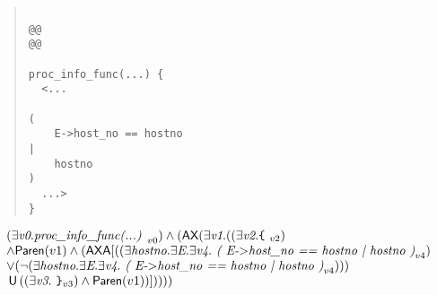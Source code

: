 \documentclass{article}
\newcommand{\U}{\,\mbox{\sf{U}}\,}
\newcommand{\A}{\mbox{\sf{A}}}
\newcommand{\AX}{\mbox{\sf{AX}}}
\newcommand{\mita}[1]{\mbox{\it{{#1}}}}
\newcommand{\msf}[1]{\mbox{\sf{{#1}}}}
\newcommand{\mth}[1]{\({#1}\)}
\newcommand{\ttlb}{\mbox{\tt \char'173}}
\newcommand{\ttrb}{\mbox{\tt \char'175}}
\begin{document}
\begin{quote}\begin{verbatim}

@@
@@

proc_info_func(...) {
  <...
    
(
    E->host_no == hostno
|
    hostno
)
  ...>
}
\end{verbatim}\end{quote}

\[\begin{array}{l}
(\exists \mita{v0} . \mita{proc\_info\_func(...) }_{v0}) \wedge (\AX(\exists \mita{v1} . ((\exists \mita{v2} . \mita{{\ttlb}
  }_{v2})\\ \wedge \msf{Paren}(v1) \wedge (\AX\A[((\exists \mita{hostno} . \exists \mita{E} . \exists \mita{v4} . \mita{
(
E-\mth{>}host\_no == hostno
|
hostno
)}_{v4})\\ \vee (\neg (\exists \mita{hostno} . \exists \mita{E} . \exists \mita{v4} . \mita{
(
E-\mth{>}host\_no == hostno
|
hostno
)}_{v4})))\\ \U ((\exists \mita{v3} . \mita{
{\ttrb}}_{v3}) \wedge \msf{Paren}(v1))]
))))
\end{array}\]
\end{document}
